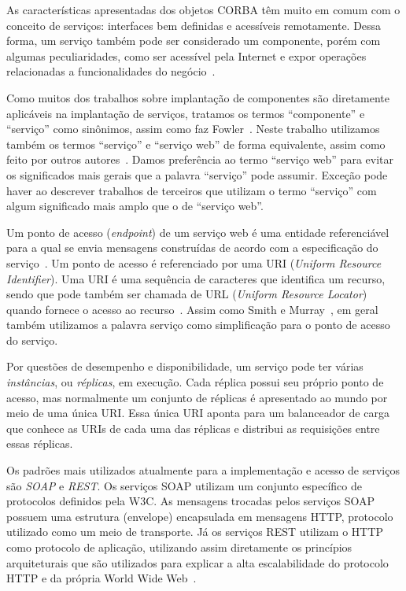 As características apresentadas dos objetos CORBA têm muito em comum com o conceito de serviços: 
interfaces bem definidas e acessíveis remotamente.
Dessa forma, um serviço também pode ser considerado um componente, porém com algumas peculiaridades, 
como ser acessível pela Internet e expor operações relacionadas a funcionalidades do negócio~\cite{Hewitt2009JavaSOA}.

Como muitos dos trabalhos sobre implantação de componentes são diretamente aplicáveis na implantação de serviços, tratamos os termos ``componente'' e ``serviço'' como sinônimos, assim como faz Fowler~\cite{Fowler2004Inversion}. Neste trabalho utilizamos também os termos ``serviço'' e ``serviço web'' de forma equivalente, assim como feito por outros autores~\cite{Watson2006Dynasoar}. Damos preferência ao termo ``serviço web'' para evitar os significados mais gerais que a palavra ``serviço'' pode assumir. Exceção pode haver ao descrever trabalhos de terceiros que utilizam o termo ``serviço'' com algum significado mais amplo que o de ``serviço web''. 

Um ponto de acesso (\textit{endpoint}) de um serviço web é uma entidade referenciável para a qual se envia mensagens construídas de acordo com a especificação do serviço~\cite{W3C2004Addressing}. 
Um ponto de acesso é referenciado por uma URI (\emph{Uniform Resource Identifier}).
Uma URI é uma sequência de caracteres que identifica um recurso, sendo que pode também ser chamada de URL (\emph{Uniform Resource Locator}) quando fornece o acesso ao recurso~\cite{rfc3986}.
Assim como Smith e Murray~\cite{Smith2010Evolution}, em geral também utilizamos a palavra serviço como simplificação para o ponto de acesso do serviço. 

Por questões de desempenho e disponibilidade, um serviço pode ter várias \emph{instâncias}, ou \emph{réplicas},
em execução. Cada réplica possui seu próprio ponto de acesso, mas normalmente um conjunto de réplicas é apresentado
ao mundo por meio de uma única URI. Essa única URI aponta para um balanceador de carga que conhece
as URIs de cada uma das réplicas e distribui as requisições entre essas réplicas.

Os padrões mais utilizados atualmente para a implementação e acesso de serviços são \emph{SOAP} e \emph{REST}. Os serviços SOAP utilizam um conjunto específico de protocolos definidos pela W3C. As mensagens trocadas pelos serviços SOAP possuem uma estrutura (envelope) encapsulada em mensagens HTTP, protocolo utilizado como um meio de transporte. Já os serviços REST utilizam o HTTP como protocolo de aplicação, utilizando assim diretamente os princípios arquiteturais que são utilizados para explicar a alta escalabilidade do protocolo HTTP e da própria World Wide Web~\cite{Pautasso2008Restful}. 

